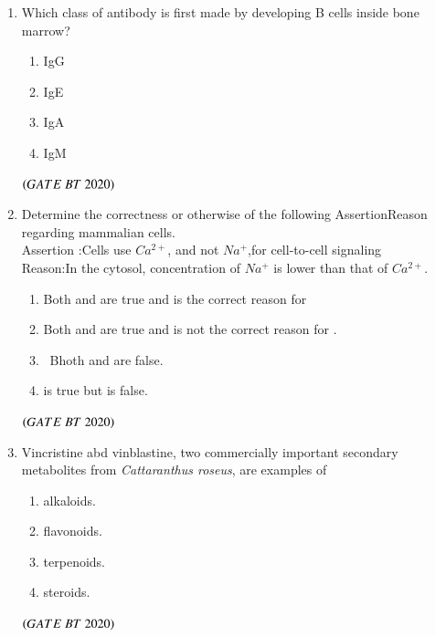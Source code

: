 \documentclass[journal,12pt,onecolumn]{IEEEtran}
\theoremstyle{remark}
\begin{document}
\begin{enumerate}[label=Q\arabic*:]
\item Which class of antibody is first made by developing B cells inside bone marrow?
\begin{multicols}{4}
\begin{enumerate}
\item\;IgG
\item\;IgE
\item\;IgA
\item\;IgM
\end{enumerate}
\end{multicols}
\hfill$\left(GATE\ BT\ 2020\right)$

\item Determine the correctness or otherwise of the following AssertionReason regarding mammalian cells.\\
Assertion :Cells use $Ca^{2+}$, and not $Na^{+}$,for cell-to-cell signaling\\
Reason:In the cytosol, concentration of $Na^{+}$ is lower than that of $Ca^{2+}$.
\begin{multicols}{2}
\begin{enumerate}
\item\;Both  and  are true and  is the correct reason for
\item\;Both   and  are true and is not the correct reason for .
\item\ Bhoth   and  are false.
\item\; is true but  is  false.

\end{enumerate}
\end{multicols}
\hfill$\left(GATE\ BT\ 2020\right)$

\item Vincristine abd vinblastine, two commercially important secondary metabolites from \textit{Cattaranthus roseus}, are examples of
\begin{multicols}{4}
\begin{enumerate}
\item\;alkaloids.  
\item\;flavonoids.
\item\;terpenoids. 
\item\;steroids.

\end{enumerate} 
\end{multicols}
\hfill$\left(GATE\ BT\ 2020\right)$


\end{enumerate}
\end{document}
